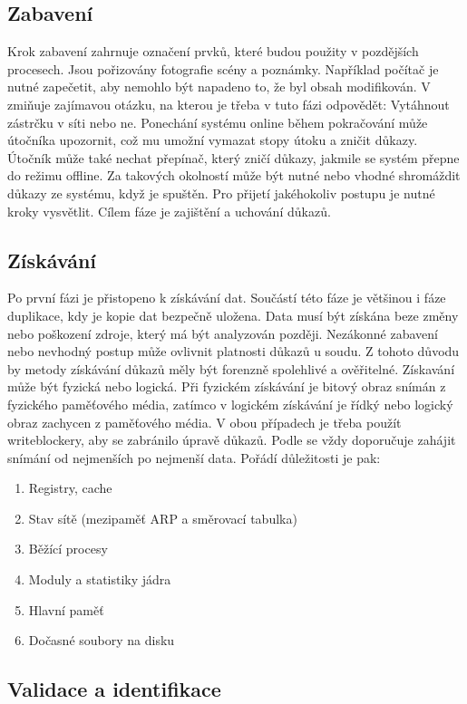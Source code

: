 \documentclass[thesis=B,czech]{FITthesis}[2012/06/26]
\begin{document}
\subsection{Zabavení}
Krok zabavení zahrnuje označení prvků, které budou použity v pozdějších procesech. Jsou pořizovány fotografie scény a poznámky. Například počítač je nutné zapečetit, aby nemohlo být napadeno to, že byl obsah modifikován. V \cite{for_sez} zmiňuje zajímavou otázku, na kterou je třeba v tuto fázi odpovědět: Vytáhnout zástrčku v síti nebo ne. Ponechání systému online během pokračování může útočníka upozornit, což mu umožní vymazat stopy útoku a zničit důkazy. Útočník může také nechat přepínač, který zničí důkazy, jakmile se systém přepne do režimu offline. Za takových okolností může být nutné nebo vhodné shromáždit důkazy ze systému, když je spuštěn. Pro přijetí jakéhokoliv postupu je nutné kroky vysvětlit. Cílem fáze je zajištění a uchování důkazů.

\subsection{Získávání}
Po první fázi je přistopeno k získávání dat. Součástí této fáze je většinou i fáze duplikace, kdy je kopie dat bezpečně uložena. Data musí být získána beze změny nebo poškození zdroje, který má být analyzován později. Nezákonné zabavení nebo nevhodný postup může ovlivnit platnosti důkazů u soudu. Z tohoto důvodu by metody získávání důkazů měly být forenzně spolehlivé a ověřitelné. Získavání může být fyzická nebo logická. Při fyzickém získávání je bitový obraz snímán z fyzického paměťového média, zatímco v logickém získávání je řídký nebo logický obraz zachycen z paměťového média. V obou případech je třeba použít writeblockery, aby se zabránilo úpravě důkazů. Podle \cite{for_sez} se vždy doporučuje zahájit snímání od nejmenších po nejmenší data. Pořádí důležitosti je pak: 

\begin{enumerate}
\item Registry, cache
\item Stav sítě (mezipaměť ARP a směrovací tabulka)
\item Běžící procesy
\item Moduly a statistiky jádra
\item Hlavní paměť
\item Dočasné soubory na disku
\end{enumerate}


\subsection{Validace a identifikace}
\end{document}
